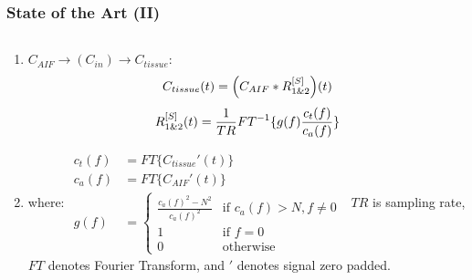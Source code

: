 %
% 

\begin{frame}
  \frametitle{State of the Art (II)}
  \cite{strakaRealTimeDiffusion2010}
    \begin{columns}[T]
    \begin{column}{0.55\textwidth}
    {\small
    \begin{enumerate}
        \item $C_{AIF} \rightarrow (C_{in}) \rightarrow C_{tissue}$:
        \begin{equation}
            \small
            C_{tissue}(t) = \left( C_{AIF} * R_{1\&2}^{[S]} \right)(t)
        \end{equation}
        \begin{equation}
            \small
            R_{1\&2}^{[S]}(t) = \frac{1}{TR}FT^{-1}\{g(f)\frac{c_t(f)}{c_a(f)}\}
        \end{equation}
        
        \item[] where:
        $\begin{aligned}
            c_t(f) &= FT\{C_{tissue}'(t)\} \\
            c_a(f) &= FT\{C_{AIF}'(t)\} \\
            g(f) &= {\left\{
            \begin{array}{lll}
            \frac{c_a(f)^2-N^2}{c_a(f)^2} & \text{if } c_a(f)>N, f\neq0 \\
            1 & \text{if } f=0 \\
            0 & \text{otherwise}
            \end{array}
            \right.}
        \end{aligned}$  
         {\tiny $TR$ is sampling rate, $FT{}$ denotes Fourier Transform, and $'$ denotes signal zero padded.}
    \end{enumerate}
    }
    \end{column}
    
    \hspace*{4em}                                                          %
    

\end{columns}
\end{frame}
